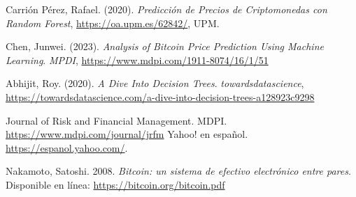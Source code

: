 \documentclass[final, 20pt, a2paper, portrait]{extarticle}
\begin{document}
\begin{thebibliography}{9}

Carrión Pérez, Rafael. (2020). \textit{Predicción de Precios de Criptomonedas con Random Forest}, \url{https://oa.upm.es/62842/}, UPM.

Chen, Junwei. (2023). \textit{Analysis of Bitcoin Price Prediction Using Machine Learning}. \textit{MPDI}, \url{https://www.mdpi.com/1911-8074/16/1/51}

Abhijit, Roy. (2020). \textit{A Dive Into Decision Trees}. \textit{towardsdatascience}, \url{https://towardsdatascience.com/a-dive-into-decision-trees-a128923c9298}

Journal of Risk and Financial Management. MDPI. \url{https://www.mdpi.com/journal/jrfm}
Yahoo! en español. \url{https://espanol.yahoo.com/}.

Nakamoto, Satoshi. 2008. \textit{Bitcoin: un sistema de efectivo electrónico entre pares}. Disponible en línea: \url{https://bitcoin.org/bitcoin.pdf}


\end{thebibliography}
\end{document}
